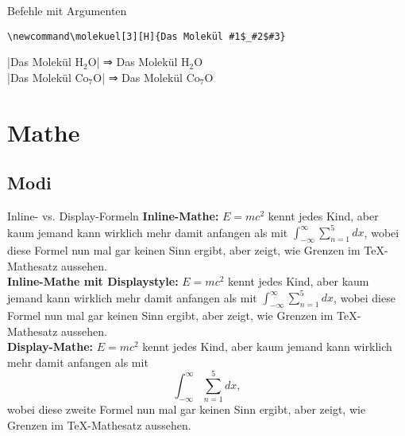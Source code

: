 \documentclass[
	vorläufig=false,
	datum=2021-11-03,
	titel={Mathematiksatz I},
	web=false,
	max,
	aspectratio=1610,
]{../tex/latexkurs-slides}
\begin{document}
\begin{frame}[fragile]{Befehle mit Argumenten}
\begin{lstlisting}
\newcommand\molekuel[3][H]{Das Molekül #1$_#2$#3}
\end{lstlisting}
\newcommand\molekuel[3][H]{Das Molekül #1$_#2$#3}
|\molekuel{2}{O}| ⇒ \molekuel{2}{O}\\
|\molekuel[Co]{7}{O}| ⇒ \molekuel[Co]{7}{O}\\
\end{frame}


\section{Mathe}
\subsection{Modi}


\begin{frame}{Inline- vs. Display-Formeln}
\rmfamily
\textbf{Inline-Mathe:} \(E=mc^2\) kennt jedes Kind, aber kaum jemand kann wirklich mehr damit anfangen als mit \(\int^\infty_{-\infty}\sum_{n = 1}^5 dx\), wobei diese Formel nun mal gar keinen Sinn ergibt, aber zeigt, wie Grenzen im \TeX-Mathesatz aussehen.\\
\textbf{Inline-Mathe mit Displaystyle:} \(E=mc^2\) kennt jedes Kind, aber kaum jemand kann wirklich mehr damit anfangen als mit \(\displaystyle \int^\infty_{-\infty}\sum_{n = 1}^5 dx\), wobei diese Formel nun mal gar keinen Sinn ergibt, aber zeigt, wie Grenzen im \TeX-Mathesatz aussehen.\\
\textbf{Display-Mathe:} \(E=mc^2\) kennt jedes Kind, aber kaum jemand kann wirklich mehr damit anfangen als mit \[\int^\infty_{-\infty}\sum_{n = 1}^5 dx,\] wobei diese zweite Formel nun mal gar keinen Sinn ergibt, aber zeigt, wie Grenzen im \TeX-Mathesatz aussehen.
\end{frame}
\end{document}

